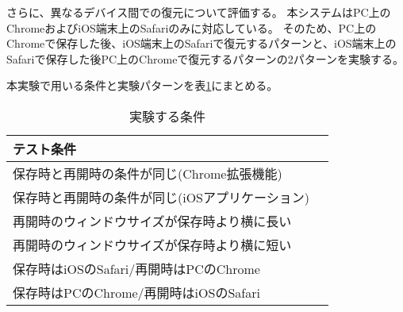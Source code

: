 さらに、異なるデバイス間での復元について評価する。
本システムはPC上のChromeおよびiOS端末上のSafariのみに対応している。
そのため、PC上のChromeで保存した後、iOS端末上のSafariで復元するパターンと、iOS端末上のSafariで保存した後PC上のChromeで復元するパターンの2パターンを実験する。

本実験で用いる条件と実験パターンを表\ref{tb:evl-scroll-position}にまとめる。

\begin{table}[htbp]
  \label{tb:evl-scroll-position}
  \caption{実験する条件}
  \begin{center}
    \begin{tabular}{|l|l|}
    \hline
    テスト条件  \\ \hline
    保存時と再開時の条件が同じ(Chrome拡張機能) \\ \hline
    保存時と再開時の条件が同じ(iOSアプリケーション) \\ \hline
    再開時のウィンドウサイズが保存時より横に長い  \\ \hline
    再開時のウィンドウサイズが保存時より横に短い  \\ \hline
    保存時はiOSのSafari/再開時はPCのChrome \\ \hline
    保存時はPCのChrome/再開時はiOSのSafari \\ \hline
    \end{tabular}
  \end{center}
\end{table}
